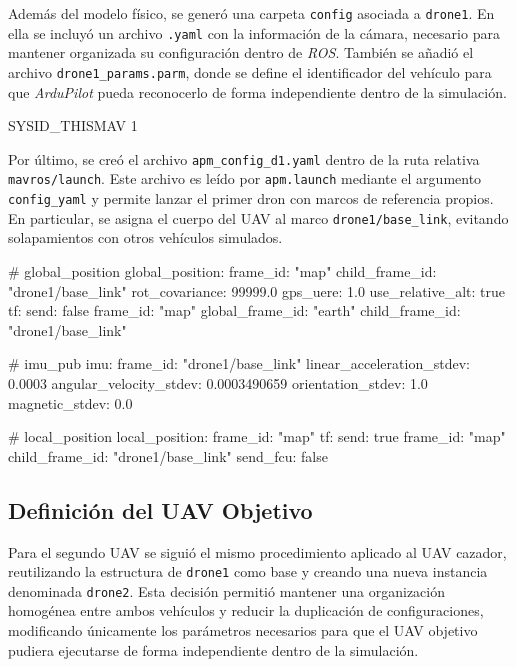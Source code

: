 Además del modelo físico, se generó una carpeta \texttt{config} asociada a \texttt{drone1}. En ella se incluyó un archivo \texttt{.yaml} con la información de la cámara, necesario para mantener organizada su configuración dentro de \textit{ROS}. También se añadió el archivo \texttt{drone1\_params.parm}, donde se define el identificador del vehículo para que \textit{ArduPilot} pueda reconocerlo de forma independiente dentro de la simulación.

\begin{listing}[caption={Identificador asignado al primer UAV en \texttt{drone1\_params.parm}},label={lst:drone1-sysid}]
SYSID_THISMAV 1
\end{listing}

Por último, se creó el archivo \texttt{apm\_config\_d1.yaml} dentro de la ruta relativa \texttt{mavros/launch}. Este archivo es leído por \texttt{apm.launch} mediante el argumento \texttt{config\_yaml} y permite lanzar el primer dron con marcos de referencia propios. En particular, se asigna el cuerpo del UAV al marco \texttt{drone1/base\_link}, evitando solapamientos con otros vehículos simulados.

\begin{listing}[caption={Fragmento principal de \texttt{apm\_config\_d1.yaml} para \texttt{drone1}},label={lst:drone1-apm-config}]
# global_position
global_position:
  frame_id: "map"
  child_frame_id: "drone1/base_link"
  rot_covariance: 99999.0
  gps_uere: 1.0
  use_relative_alt: true
  tf:
    send: false
    frame_id: "map"
    global_frame_id: "earth"
    child_frame_id: "drone1/base_link"

# imu_pub
imu:
  frame_id: "drone1/base_link"
  linear_acceleration_stdev: 0.0003
  angular_velocity_stdev: 0.0003490659
  orientation_stdev: 1.0
  magnetic_stdev: 0.0

# local_position
local_position:
  frame_id: "map"
  tf:
    send: true
    frame_id: "map"
    child_frame_id: "drone1/base_link"
    send_fcu: false
\end{listing}


\subsection{Definición del UAV Objetivo}
Para el segundo UAV se siguió el mismo procedimiento aplicado al UAV cazador, reutilizando la estructura de \texttt{drone1} como base y creando una nueva instancia denominada \texttt{drone2}. Esta decisión permitió mantener una organización homogénea entre ambos vehículos y reducir la duplicación de configuraciones, modificando únicamente los parámetros necesarios para que el UAV objetivo pudiera ejecutarse de forma independiente dentro de la simulación.

